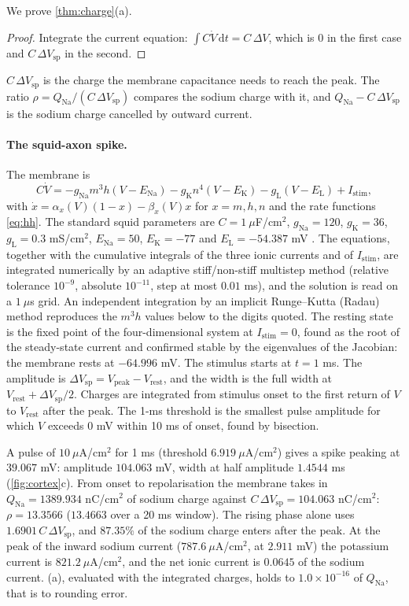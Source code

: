 \documentclass[11pt]{article}
\theoremstyle{definition}\newtheorem{definition}[theorem]{Definition}
\theoremstyle{remark}\newtheorem{remark}[theorem]{Remark}
\begin{document}
We prove \cref{thm:charge}(a).
\begin{proof}
Integrate the current equation: $\int C\dot V\,\mathrm dt=C\,\Delta V$, which is $0$ in the first case and $C\,\Delta V_{\mathrm{sp}}$ in the second.
\end{proof}
$C\,\Delta V_{\mathrm{sp}}$ is the charge the membrane capacitance needs to reach the peak. The ratio $\rho=Q_{\mathrm{Na}}/(C\,\Delta V_{\mathrm{sp}})$ compares the sodium charge with it, and $Q_{\mathrm{Na}}-C\,\Delta V_{\mathrm{sp}}$ is the sodium charge cancelled by outward current.

\paragraph{The squid-axon spike.} The membrane is
\[
C\dot V=-g_{\mathrm{Na}}m^3h(V-E_{\mathrm{Na}})-g_{\mathrm{K}}n^4(V-E_{\mathrm{K}})-g_{\mathrm{L}}(V-E_{\mathrm{L}})+I_{\mathrm{stim}},
\]
with $\dot x=\alpha_x(V)(1-x)-\beta_x(V)x$ for $x=m,h,n$ and the rate functions \eqref{eq:hh}. The standard squid parameters are $C=1\ \mu$F/cm$^2$, $g_{\mathrm{Na}}=120$, $g_{\mathrm{K}}=36$, $g_{\mathrm{L}}=0.3$ mS/cm$^2$, $E_{\mathrm{Na}}=50$, $E_{\mathrm{K}}=-77$ and $E_{\mathrm{L}}=-54.387$ mV \cite{HH,DayanAbbott}. The equations, together with the cumulative integrals of the three ionic currents and of $I_{\mathrm{stim}}$, are integrated numerically by an adaptive stiff/non-stiff multistep method (relative tolerance $10^{-9}$, absolute $10^{-11}$, step at most $0.01$ ms), and the solution is read on a $1\ \mu$s grid. An independent integration by an implicit Runge--Kutta (Radau) method reproduces the $m^3h$ values below to the digits quoted. The resting state is the fixed point of the four-dimensional system at $I_{\mathrm{stim}}=0$, found as the root of the steady-state current and confirmed stable by the eigenvalues of the Jacobian: the membrane rests at $-64.996$ mV. The stimulus starts at $t=1$ ms. The amplitude is $\Delta V_{\mathrm{sp}}=V_{\mathrm{peak}}-V_{\mathrm{rest}}$, and the width is the full width at $V_{\mathrm{rest}}+\Delta V_{\mathrm{sp}}/2$. Charges are integrated from stimulus onset to the first return of $V$ to $V_{\mathrm{rest}}$ after the peak. The 1-ms threshold is the smallest pulse amplitude for which $V$ exceeds $0$ mV within 10 ms of onset, found by bisection.

A pulse of $10\ \mu$A/cm$^2$ for 1 ms (threshold $6.919\ \mu$A/cm$^2$) gives a spike peaking at $39.067$ mV: amplitude $104.063$ mV, width at half amplitude $1.4544$ ms (\cref{fig:cortex}c). From onset to repolarisation the membrane takes in $Q_{\mathrm{Na}}=1389.934$ nC/cm$^2$ of sodium charge against $C\,\Delta V_{\mathrm{sp}}=104.063$ nC/cm$^2$: $\rho=13.3566$ ($13.4663$ over a 20 ms window). The rising phase alone uses $1.6901\,C\,\Delta V_{\mathrm{sp}}$, and $87.35\%$ of the sodium charge enters after the peak. At the peak of the inward sodium current ($787.6\ \mu$A/cm$^2$, at $2.911$ mV) the potassium current is $821.2\ \mu$A/cm$^2$, and the net ionic current is $0.0645$ of the sodium current. (a), evaluated with the integrated charges, holds to $1.0\times10^{-16}$ of $Q_{\mathrm{Na}}$, that is to rounding error.
\end{document}
